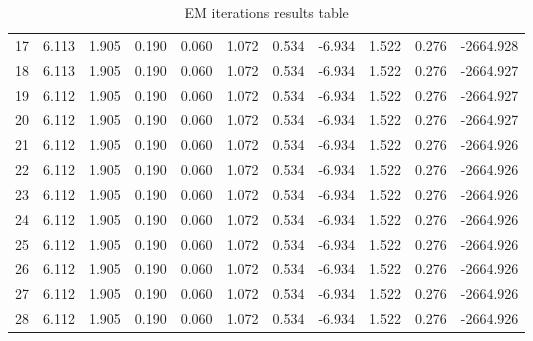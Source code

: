 \documentclass[]{article}
\begin{document}
\begin{table}[H]
{\begin{tabular}{|c|c|c|c|c|c|c|c|c|c|c|}
		17 & 6.113  & 1.905  & 0.190  & 0.060  & 1.072  & 0.534  & -6.934  & 1.522  & 0.276  & -2664.928 \\
		18 & 6.113  & 1.905  & 0.190  & 0.060  & 1.072  & 0.534  & -6.934  & 1.522  & 0.276  & -2664.927 \\
		19 & 6.112  & 1.905  & 0.190  & 0.060  & 1.072  & 0.534  & -6.934  & 1.522  & 0.276  & -2664.927 \\
		20 & 6.112  & 1.905  & 0.190  & 0.060  & 1.072  & 0.534  & -6.934  & 1.522  & 0.276  & -2664.927 \\
		21 & 6.112  & 1.905  & 0.190  & 0.060  & 1.072  & 0.534  & -6.934  & 1.522  & 0.276  & -2664.926 \\
		22 & 6.112  & 1.905  & 0.190  & 0.060  & 1.072  & 0.534  & -6.934  & 1.522  & 0.276  & -2664.926 \\
		23 & 6.112  & 1.905  & 0.190  & 0.060  & 1.072  & 0.534  & -6.934  & 1.522  & 0.276  & -2664.926 \\
		24 & 6.112  & 1.905  & 0.190  & 0.060  & 1.072  & 0.534  & -6.934  & 1.522  & 0.276  & -2664.926 \\
		25 & 6.112  & 1.905  & 0.190  & 0.060  & 1.072  & 0.534  & -6.934  & 1.522  & 0.276  & -2664.926 \\
		26 & 6.112  & 1.905  & 0.190  & 0.060  & 1.072  & 0.534  & -6.934  & 1.522  & 0.276  & -2664.926 \\
		27 & 6.112  & 1.905  & 0.190  & 0.060  & 1.072  & 0.534  & -6.934  & 1.522  & 0.276  & -2664.926 \\
		28 & 6.112  & 1.905  & 0.190  & 0.060  & 1.072  & 0.534  & -6.934  & 1.522  & 0.276  & -2664.926 \\
		\hline
	\end{tabular}
	}
	\caption{EM iterations results table}
	\label{tab:gmm_iterations_3dp}
\end{table}
\end{document}
